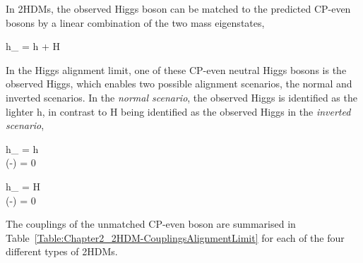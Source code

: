 In 2HDMs, the observed Higgs boson can be matched to the predicted CP-even bosons by a linear combination of the two mass eigenstates,

\begin{equation_pad}
    h_{} = \sin{(\beta - \alpha)} h + \cos{(\beta - \alpha)} H 
\end{equation_pad}

In the Higgs alignment limit, one of these CP-even neutral Higgs bosons is the observed Higgs, which enables two possible alignment scenarios, the normal and inverted scenarios. In the \textit{normal scenario}, the observed Higgs is identified as the lighter h, in contrast to H being identified as the observed Higgs in the \textit{inverted scenario}, 

\begin{equation_pad}
\begin{rcases}
  h_{} = h \\
  \cos(\beta-\alpha) = 0 
\quad \end{rcases}
\quad {}
\label{Equation:Chapter2-NormalScenario}
\end{equation_pad}

\begin{equation_pad}
\begin{rcases}
  h_{} = H \\
  \sin(\beta-\alpha) = 0
\quad \end{rcases}
\quad {}
\label{Equation:Chapter2-InvertedScenario}
\end{equation_pad}

The couplings of the unmatched CP-even boson are summarised in Table~\ref{Table:Chapter2_2HDM-CouplingsAlignmentLimit} for each of the four different types of 2HDMs.

